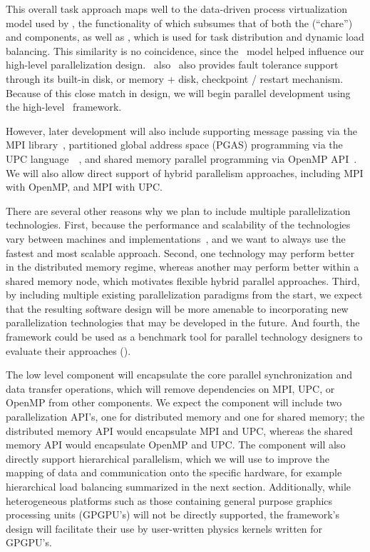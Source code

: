 \documentclass[10pt,twocolumn]{article}
\begin{document}
This overall task approach maps well to the data-driven process
virtualization model used by \charm, the functionality of which
subsumes that of both the  (``chare'') and 
components, as well as , which is used for task
distribution and dynamic load balancing.  This
similarity is no coincidence, since the \charm\ model helped influence
our high-level parallelization design.  \charm\ also \charm\ also
provides fault tolerance support through its built-in disk, or memory
+ disk, checkpoint / restart mechanism.  Because of this close match
in design, we will begin parallel development using the high-level
\charm\ framework.

However, later development will also include supporting message
passing via the MPI library~\cite{wwwmpi}, partitioned global address
space (PGAS) programming via the UPC
language~\cite{wwwupc}~\cite{upc}, and shared memory parallel
programming via OpenMP API~\cite{wwwopenmp}.  We will also allow
direct support of hybrid parallelism approaches, including MPI with
OpenMP, and MPI with UPC.

There are several other reasons why we plan to include multiple
parallelization technologies.  First, because the performance and
scalability of the technologies vary between machines and
implementations~\cite{MaTa09}, and we want to always use the fastest
and most scalable approach.  Second, one technology may perform better
in the distributed memory regime, whereas another may perform better
within a shared memory node, which motivates flexible hybrid parallel
approaches.  Third, by including multiple existing parallelization
paradigms from the start, we expect that the resulting software design
will be more amenable to incorporating new parallelization
technologies that may be developed in the future.  And fourth, the
framework could be used as a benchmark tool for parallel technology
designers to evaluate their approaches (\cite{WeSu07}).

The low level  component will encapsulate the core
parallel synchronization and data transfer operations, which will
remove dependencies on MPI, UPC, or OpenMP from other components.  We
expect the  component will include two parallelization
API's, one for distributed memory and one for shared memory; the
distributed memory API would encapsulate MPI and UPC, whereas the
shared memory API would encapsulate OpenMP and UPC.  The
 component will also directly support hierarchical
parallelism, which we will use to improve the mapping of data and
communication onto the specific hardware, for example hierarchical
load balancing summarized in the next section.  Additionally, while
heterogeneous platforms such as those containing general purpose
graphics processing units (GPGPU's) will not be directly supported,
the framework's design will facilitate their use by user-written
physics kernels written for GPGPU's.
\end{document}
